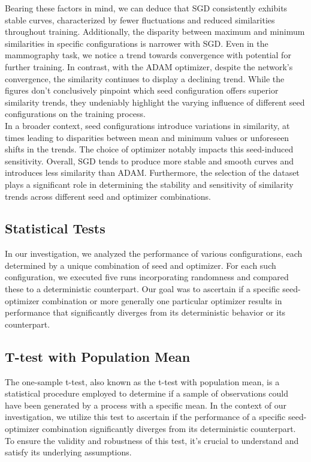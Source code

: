 Bearing these factors in mind, we can deduce that SGD consistently exhibits stable curves, characterized by fewer fluctuations and reduced similarities throughout training. Additionally, the disparity between maximum and minimum similarities in specific configurations is narrower with SGD. Even in the mammography task, we notice a trend towards convergence with potential for further training. In contrast, with the ADAM optimizer, despite the network's convergence, the similarity continues to display a declining trend. While the figures don't conclusively pinpoint which seed configuration offers superior similarity trends, they undeniably highlight the varying influence of different seed configurations on the training process.\\

In a broader context, seed configurations introduce variations in similarity, at times leading to disparities between mean and minimum values or unforeseen shifts in the trends. The choice of optimizer notably impacts this seed-induced sensitivity. Overall, SGD tends to produce more stable and smooth curves and introduces less similarity than ADAM. Furthermore, the selection of the dataset plays a significant role in determining the stability and sensitivity of similarity trends across different seed and optimizer combinations.

\subsection{Statistical Tests}

In our investigation, we analyzed the performance of various configurations, each determined by a unique combination of seed and optimizer. For each such configuration, we executed five runs incorporating randomness and compared these to a deterministic counterpart. Our goal was to ascertain if a specific seed-optimizer combination or more generally one particular optimizer results in performance that significantly diverges from its deterministic behavior or its counterpart.

\subsection*{T-test with Population Mean}

The one-sample t-test, also known as the t-test with population mean, is a statistical procedure employed to determine if a sample of observations could have been generated by a process with a specific mean. In the context of our investigation, we utilize this test to ascertain if the performance of a specific seed-optimizer combination significantly diverges from its deterministic counterpart. To ensure the validity and robustness of this test, it's crucial to understand and satisfy its underlying assumptions.

